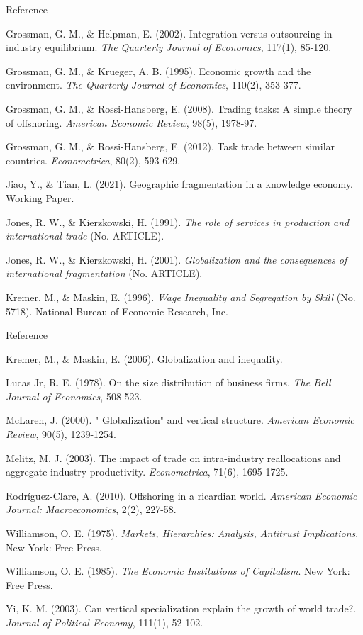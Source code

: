 \documentclass{beamer}
\begin{document}
\begin{frame}{Reference}
	\addtocounter{framenumber}{-1}
	\footnotesize
	Grossman, G. M., \& Helpman, E. (2002). Integration versus outsourcing in industry equilibrium. \textit{The Quarterly Journal of Economics}, 117(1), 85-120.

	Grossman, G. M., \& Krueger, A. B. (1995). Economic growth and the environment. \textit{The Quarterly Journal of Economics}, 110(2), 353-377.

	Grossman, G. M., \& Rossi-Hansberg, E. (2008). Trading tasks: A simple theory of offshoring. \textit{American Economic Review}, 98(5), 1978-97.

	Grossman, G. M., \& Rossi-Hansberg, E. (2012). Task trade between similar countries. \textit{Econometrica}, 80(2), 593-629.

	Jiao, Y., \& Tian, L. (2021). Geographic fragmentation in a knowledge economy. Working Paper.

	Jones, R. W., \& Kierzkowski, H. (1991). \textit{The role of services in production and international trade} (No. ARTICLE).

	Jones, R. W., \& Kierzkowski, H. (2001). \textit{Globalization and the consequences of international fragmentation} (No. ARTICLE).

	Kremer, M., \& Maskin, E. (1996). \textit{Wage Inequality and Segregation by Skill} (No. 5718). National Bureau of Economic Research, Inc.
\end{frame}
\begin{frame}{Reference}
	\addtocounter{framenumber}{-1}
	\footnotesize
	Kremer, M., \& Maskin, E. (2006). Globalization and inequality.

	Lucas Jr, R. E. (1978). On the size distribution of business firms. \textit{The Bell Journal of Economics}, 508-523.

	McLaren, J. (2000). " Globalization" and vertical structure. \textit{American Economic Review}, 90(5), 1239-1254.
	
	Melitz, M. J. (2003). The impact of trade on intra-industry reallocations and aggregate industry productivity. \textit{Econometrica}, 71(6), 1695-1725.
	
	Rodr\'iguez-Clare, A. (2010). Offshoring in a ricardian world. \textit{American Economic Journal: Macroeconomics}, 2(2), 227-58.

	Williamson, O. E. (1975). \textit{Markets, Hierarchies: Analysis, Antitrust Implications}. New York: Free Press.

	Williamson, O. E. (1985). \textit{The Economic Institutions of Capitalism}. New York: Free Press.

	Yi, K. M. (2003). Can vertical specialization explain the growth of world trade?. \textit{Journal of Political Economy}, 111(1), 52-102.
\end{frame}
\end{document}
